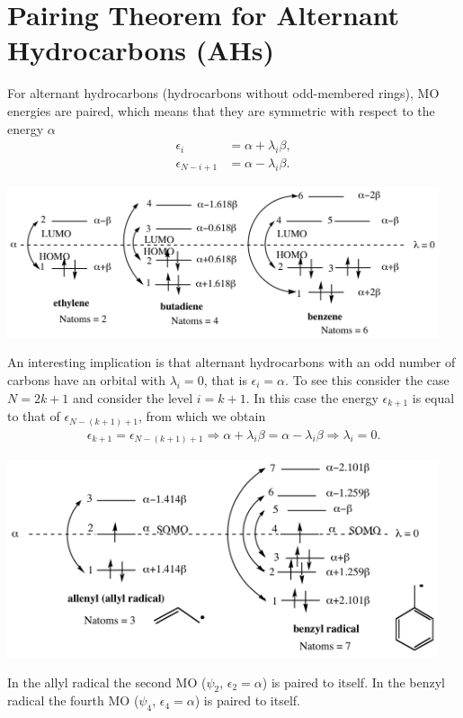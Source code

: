 \documentclass[../Main/chem532-notes.tex]{subfiles}
\begin{document}
\section{Pairing Theorem for Alternant Hydrocarbons (AHs)}
For alternant hydrocarbons (hydrocarbons without odd-membered rings), MO energies are paired, which means that they are symmetric with respect to the energy $\alpha$
\begin{align}
\epsilon_i &= \alpha + \lambda_i \beta, \\
\epsilon_{N - i + 1} &= \alpha - \lambda_i \beta.
\end{align}

\begin{example}
\includegraphics[width = 5in]{../huckel/c2_pairing_theorem.png}
\end{example}

An interesting implication is that alternant hydrocarbons with an odd number of carbons have an orbital with $\lambda_i = 0$, that is $\epsilon_i = \alpha$.
To see this consider the case $N = 2k + 1$ and consider the level $i = k + 1$. In this case the energy $\epsilon_{k + 1}$ is equal to that of $\epsilon_{N - (k + 1) + 1}$, from which we obtain
\begin{align}
\epsilon_{k + 1} = \epsilon_{N - (k + 1) + 1} \Rightarrow \alpha + \lambda_i \beta=  \alpha - \lambda_i \beta  \Rightarrow \lambda_i = 0.
\end{align}

\begin{example}
\includegraphics[width = 5in]{../huckel/c2_pairing_theorem2.png}

In the allyl radical the second MO ($\psi_2$, $\epsilon_2 = \alpha$) is paired to itself. In the benzyl radical the fourth MO ($\psi_4$, $\epsilon_4 = \alpha$) is paired to itself.
\end{example}
\end{document}
